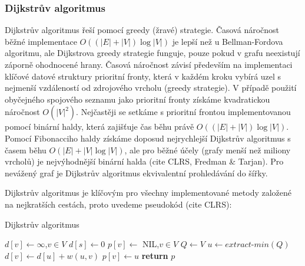 \documentclass{bakalarka}
\begin{document}
\subsubsection{Dijkstrův algoritmus}
Dijkstrův algoritmus řeší  pomocí greedy
(žravé) strategie. Časová náročnost běžné implementace $O((|E| + |V|)\log|V|)$
je lepší než u Bellman-Fordova algoritmu, ale Dijkstrova greedy strategie
funguje, pouze pokud v grafu neexistují záporně ohodnocené hrany. Časová
náročnost závisí především na implementaci klíčové datové struktury prioritní
fronty, která v každém kroku vybírá uzel s nejmenší vzdáleností od zdrojového
vrcholu (greedy strategie). V případě použití obyčejného spojového seznamu jako
prioritní fronty získáme kvadratickou náročnost $O(|V|^2)$. Nejčastěji se
setkáme s prioritní frontou implementovanou pomocí binární haldy, která
zajišťuje čas běhu právě $O((|E| + |V|)\log|V|)$. Pomocí Fibonacciho haldy
získáme doposud nejrychlejší Dijkstrův algoritmus s časem běhu $O(|E| + |V|
\log|V|)$, ale pro běžné účely (grafy menší než miliony vrcholů) je
nejvýhodnější binární halda (cite CLRS, Fredman \& Tarjan). Pro nevážený graf
je Dijkstrův algoritmus ekvivalentní prohledávání do šířky.

Dijkstrův algoritmus je klíčovým pro všechny implementované metody založené na
nejkratších cestách, proto uvedeme pseudokód (cite CLRS):

\begin{center}
\begin{minipage}{\textwidth}
\begin{algorithm}[H]
	\caption{Dijkstrův algoritmus}
		\label{alg:dijkstra}
	\begin{algorithmic}[1]
	\Statex
	  
		\State $d[v] \gets \infty$,$v \in V$
		\State $d[s] \gets 0$
		\State $p[v] \gets $ NIL,$v \in V$
		\State $Q \gets V$
			\State $u \gets extract\mbox{-}min(Q)$
					\State $d[v] \gets d[u] + w(u, v)$
					\State $p[v] \gets u$
				\EndIf
			\EndFor
		\EndWhile
		\State \textbf{return} $p$
	\EndFunction
	\end{algorithmic}
\end{algorithm}
\end{minipage}
\end{center}
\mbox{}
\end{document}
